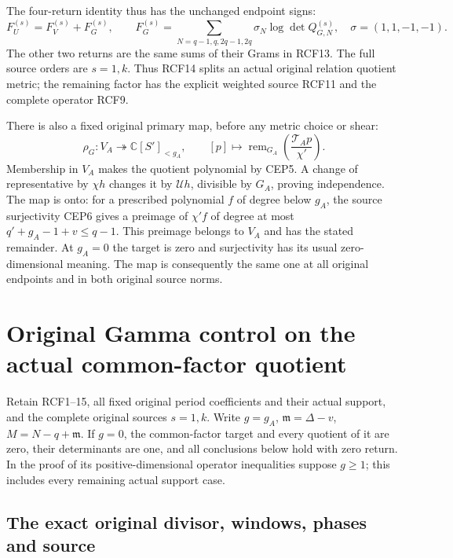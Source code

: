 \documentclass[11pt,a4paper]{article}
\begin{document}
The four-return identity thus has the unchanged endpoint signs:
\[
 F_U^{(s)}=F_V^{(s)}+F_G^{(s)},\qquad
 F_G^{(s)}=\sum_{N=q-1,q,2q-1,2q}\sigma_N\log\det Q_{G,N}^{(s)},
 \quad\sigma=(1,1,-1,-1).
 \tag{RCF14}
\]
The other two returns are the same sums of their Grams in
RCF13. The full source orders are $s=1,k$. Thus RCF14
splits an actual original relation quotient metric; the
remaining factor has the explicit weighted source RCF11
and the complete operator RCF9.

There is also a fixed original primary map, before any metric
choice or shear:
\[
 \rho_G:V_A\twoheadrightarrow\mathbb C[S']_{<g_A},\qquad
 [p]\longmapsto\operatorname{rem}_{G_A}
                   \left(\frac{\mathcal T_Ap}{\chi'}\right).
 \tag{RCF15}
\]
Membership in $V_A$ makes the quotient polynomial by CEP5.
A change of representative by $\chi h$ changes it by
$\mathcal Uh$, divisible by $G_A$, proving independence.
The map is onto: for a prescribed polynomial $f$ of degree
below $g_A$, the source surjectivity CEP6 gives a preimage
of $\chi'f$ of degree at most $q'+g_A-1+v\le q-1$.
This preimage belongs to $V_A$ and has the stated remainder.
At $g_A=0$ the target is zero and surjectivity has its usual
zero-dimensional meaning. The map is consequently the same
one at all original endpoints and in both original source norms.


\clearpage
\section{Original Gamma control on the actual common-factor quotient}
\label{sec:RCM}

Retain RCF1--15, all fixed original period coefficients and their
actual support, and the complete original sources $s=1,k$.
Write $g=g_A$, $\mathfrak m=\Delta-v$, $M=N-q+\mathfrak m$.
If $g=0$, the common-factor target and every quotient of it
are zero, their determinants are one, and all conclusions below
hold with zero return. In the proof of its positive-dimensional
operator inequalities suppose $g\ge1$; this includes every
remaining actual support case.

\subsection{The exact original divisor, windows, phases and source}
\end{document}
